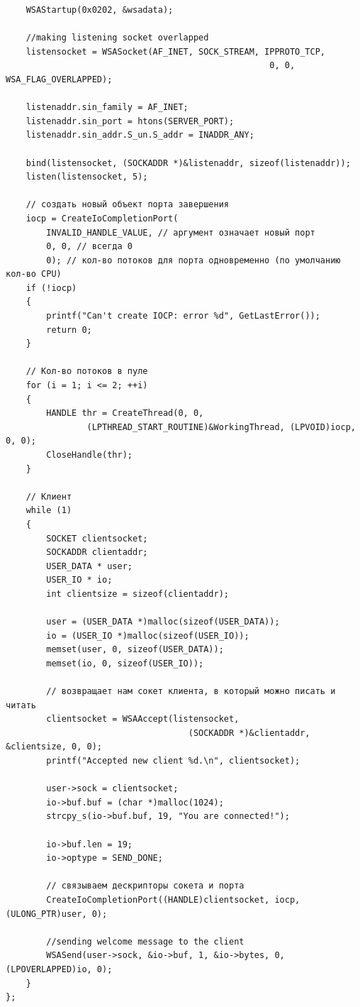 \documentclass[a4paper,12pt]{article} %
\begin{document}
\begin{verbatim}
    WSAStartup(0x0202, &wsadata);

    //making listening socket overlapped
    listensocket = WSASocket(AF_INET, SOCK_STREAM, IPPROTO_TCP,
                                                    0, 0, WSA_FLAG_OVERLAPPED);

    listenaddr.sin_family = AF_INET;
    listenaddr.sin_port = htons(SERVER_PORT);
    listenaddr.sin_addr.S_un.S_addr = INADDR_ANY;

    bind(listensocket, (SOCKADDR *)&listenaddr, sizeof(listenaddr));
    listen(listensocket, 5);

    // создать новый объект порта завершения
    iocp = CreateIoCompletionPort(
        INVALID_HANDLE_VALUE, // аргумент означает новый порт
        0, 0, // всегда 0
        0); // кол-во потоков для порта одновременно (по умолчанию кол-во CPU)
    if (!iocp)
    {
        printf("Can't create IOCP: error %d", GetLastError());
        return 0;
    }

    // Кол-во потоков в пуле
    for (i = 1; i <= 2; ++i)
    {
        HANDLE thr = CreateThread(0, 0,
                (LPTHREAD_START_ROUTINE)&WorkingThread, (LPVOID)iocp, 0, 0);
        CloseHandle(thr);
    }

    // Клиент
    while (1)
    {
        SOCKET clientsocket;
        SOCKADDR clientaddr;
        USER_DATA * user;
        USER_IO * io;
        int clientsize = sizeof(clientaddr);

        user = (USER_DATA *)malloc(sizeof(USER_DATA));
        io = (USER_IO *)malloc(sizeof(USER_IO));
        memset(user, 0, sizeof(USER_DATA));
        memset(io, 0, sizeof(USER_IO));

        // возвращает нам сокет клиента, в который можно писать и читать
        clientsocket = WSAAccept(listensocket,
                                    (SOCKADDR *)&clientaddr, &clientsize, 0, 0);
        printf("Accepted new client %d.\n", clientsocket);

        user->sock = clientsocket;
        io->buf.buf = (char *)malloc(1024);
        strcpy_s(io->buf.buf, 19, "You are connected!");

        io->buf.len = 19;
        io->optype = SEND_DONE;

        // связываем дескрипторы сокета и порта
        CreateIoCompletionPort((HANDLE)clientsocket, iocp, (ULONG_PTR)user, 0);

        //sending welcome message to the client
        WSASend(user->sock, &io->buf, 1, &io->bytes, 0, (LPOVERLAPPED)io, 0);
    }
};
\end{verbatim}
\end{document}
